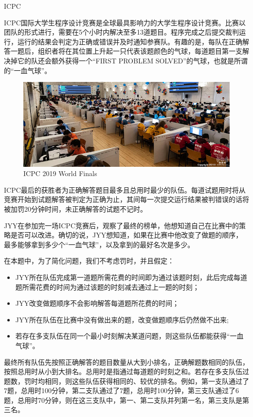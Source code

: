 \begin{Problem}{ICPC}{}

ICPC国际大学生程序设计竞赛是全球最具影响力的大学生程序设计竞赛。比赛以团队的形式进行，需要在5个小时内解决至多13道题目。程序完成之后提交裁判运行，运行的结果会判定为正确或错误并及时通知参赛队。有趣的是，每队在正确解答一题后，组织者将在其位置上升起一只代表该题颜色的气球，每道题目第一支解决掉它的队还会额外获得一个“FIRST PROBLEM SOLVED”的气球，也就是所谓的“一血气球”。

\begin{figure}[h]
\centering
\includegraphics[width=12cm]{src/scoreboard/porto.jpg}
\caption{ICPC 2019 World Finals}
\end{figure}

ICPC最后的获胜者为正确解答题目最多且总用时最少的队伍。每道试题用时将从竞赛开始到试题解答被判定为正确为止，其间每一次提交运行结果被判错误的话将被加罚20分钟时间，未正确解答的试题不记时。

JYY在参加完一场ICPC竞赛后，观察了最终的榜单，他想知道自己在比赛中的策略是否可以改进。确切的说，JYY想知道，如果在比赛中他改变了做题的顺序，最多能够拿到多少个“一血气球”，以及拿到的最好名次是多少。

在本题中，为了简化问题，我们不考虑罚时，并且假定：
\begin{itemize}
\item JYY所在队伍完成第一道题所需花费的时间即为通过该题时刻，此后完成每道题所需花费的时间为通过该题的时刻减去通过上一题的时刻；
\item JYY改变做题顺序不会影响解答每道题所花费的时间；
\item JYY所在队伍在比赛中没有做出来的题，改变做题顺序后仍然做不出来;
\item 若存在多支队伍在同一个最小时刻解决某道问题，则这些队伍都能获得“一血气球”。
\end{itemize}

最终所有队伍先按照正确解答的题目数量从大到小排名，正确解题数相同的队伍，按照总用时从小到大排名。总用时是指通过每道题的时刻之和。若存在多支队伍过题数，罚时均相同，则这些队伍获得相同的、较优的排名。例如，第一支队通过了7题，总用时100分钟，第二支队通过了7题，总用时100分钟，第三支队通过了6题，总用时70分钟，则在这三支队中，第一、第二支队并列第一名，第三支队是第三名。


\end{Problem}
